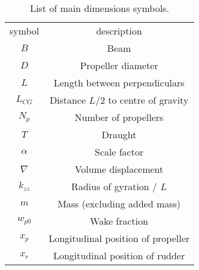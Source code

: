 \begin{table}[h]
\footnotesize
\caption{List of main dimensions symbols.}
    \label{tab:nomenclature}

    \centering
    \begin{tabular}{c c}
\toprule


symbol
&

description
\\


\(B\)
&

Beam
\\


\(D\)
&

Propeller diameter
\\


\(L\)
&

Length between perpendiculars
\\


\(L_{CG}\)
&

Distance \(L/2\) to centre of gravity
\\


\(N_p\)
&

Number of propellers
\\


\(T\)
&

Draught
\\


\(\alpha\)
&

Scale factor
\\


\(\nabla\)
&

Volume displacement
\\


\(k_{zz}\)
&

Radius of gyration / \(L\)
\\


\(m\)
&

Mass (excluding added mass)
\\


\(w_{p0}\)
&

Wake fraction
\\


\(x_{p}\)
&

Longitudinal position of propeller
\\


\(x_{r}\)
&

Longitudinal position of rudder
\\
\bottomrule
\end{tabular}
\end{table}
